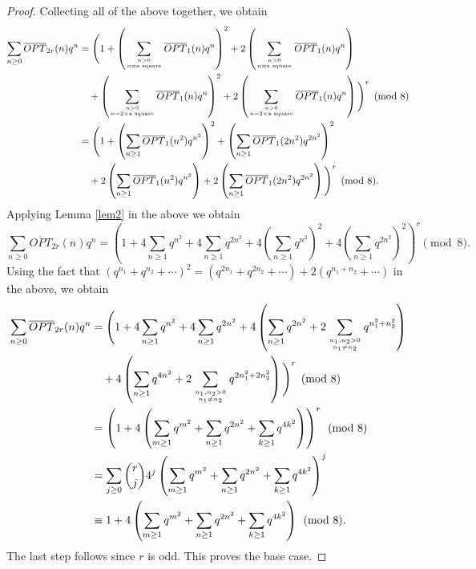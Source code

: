 \documentclass[12pt,reqno]{amsart}
\numberwithin{equation}{section}
\newcommand\mycom[2]{\genfrac{}{}{0pt}{}{#1}{#2}}
\newcommand{\opt}{\overline{OPT}}
\begin{document}
\begin{proof}
Collecting all of the above together, we obtain
\begin{align*}
    \sum_{n\geq 0}\opt_{2r}(n)q^n&=\Biggl(1+\left(\sum_{\mycom{n>0}{n= \text{a square}}}\opt_1(n)q^n\right)^2+2\left(\sum_{\mycom{n>0}{n=\text{a square}}}\opt_1(n)q^n\right)\\
    &\quad +\left(\sum_{\mycom{n>0}{n=2\times \text{a square}}}\opt_1(n)q^n\right)^2+2\left(\sum_{\mycom{n>0}{n=2\times \text{a square}}}\opt_1(n)q^n\right)\Biggl)^r\pmod 8\\
    &=\Biggl(1+\left(\sum_{n\geq 1}\opt_1(n^2)q^{n^2}\right)^2+\left(\sum_{n\geq 1}\opt_1(2n^2)q^{2n^2}\right)^2\\
    &\quad +2\left(\sum_{n\geq 1}\opt_1(n^2)q^{n^2}\right)+2\left(\sum_{n\geq 1}\opt_1(2n^2)q^{2n^2}\right)\Biggl)^r\pmod 8.
\end{align*}
Applying Lemma \ref{lem2} in the above we obtain
\begin{equation*}
     \sum_{n\geq 0}\opt_{2r}(n)q^n=\left(1+4\sum_{n\geq 1}q^{n^2}+4\sum_{n\geq 1}q^{2n^2}+4\left(\sum_{n\geq 1}q^{n^2}\right)^2+4\left(\sum_{n\geq 1}q^{2n^2}\right)^2\right)^r \pmod 8.
\end{equation*}
Using the fact that $(q^{n_1}+q^{n_2}+\cdots )^2=(q^{2n_1}+q^{2n_2}+\cdots )+2(q^{n_1+n_2}+\cdots)$ in the above, we obtain
\begin{align*}
    \sum_{n\geq 0}\opt_{2r}(n)q^n&=\Biggl(1+4\sum_{n\geq 1}q^{n^2}+4\sum_{n\geq 1}q^{2n^2}+4\left(\sum_{n\geq 1}q^{2n^2}+2\sum_{\mycom{n_1,n_2>0}{n_1\neq n_2}}q^{n_1^2+n_2^2}\right)\\
    &\quad +4\left(\sum_{n\geq 1}q^{4n^2}+2\sum_{\mycom{n_1,n_2>0}{n_1\neq n_2}}q^{2n_1^2+2n_2^2}\right)\Biggl)^r\pmod 8\\
    &=\left(1+4\left(\sum_{m\geq 1}q^{m^2}+\sum_{n\geq 1}q^{2n^2}+\sum_{k\geq 1}q^{4k^2}\right)\right)^r\pmod8\\
    &=\sum_{j\geq 0}\binom{r}{j}4^j\left(\sum_{m\geq 1}q^{m^2}+\sum_{n\geq 1}q^{2n^2}+\sum_{k\geq 1}q^{4k^2}\right)^j\\
    &\equiv 1+4\left(\sum_{m\geq 1}q^{m^2}+\sum_{n\geq 1}q^{2n^2}+\sum_{k\geq 1}q^{4k^2}\right)\pmod 8.
\end{align*}
The last step follows since $r$ is odd. This proves the base case.


\end{proof}
\end{document}
